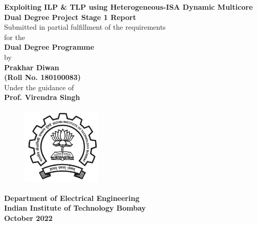 \documentclass[a4paper,12pt, final]{report}
\begin{document}
  \thispagestyle{empty}
  \vspace*{1cm}
  {\centering     
  \textbf{\LARGE Exploiting ILP \& TLP using Heterogeneous-ISA Dynamic Multicore}\\
  \vspace{1.20cm}
  \textbf{\large Dual Degree Project Stage 1 Report}\\
  \vspace{1cm}
  {Submitted in partial fulfillment of the requirements}\\
  \vspace{0.25cm}
  {for the}\\
  \vspace{1cm}
  \textbf{Dual Degree Programme}\\
  \vspace{1.50cm}
  {by}\\
  \vspace{0.20cm}
  \textbf{\large Prakhar Diwan}\\
  \vspace{0.25cm}
  \textbf{\large (Roll No. 180100083)}\\
  \vspace{1.8cm}
  {Under the guidance of}\\
  \vspace{0.20cm}
  \textbf{\large Prof. Virendra Singh}\\
    \vspace{0.30cm}
  \vspace{1.450cm}
    \begin{figure}[htb]
    \begin{center}
    \includegraphics[height=1.5in,width=1.5in]{iitblogo.png}
    \end{center}
    \end{figure}

    
  {\textbf{Department of Electrical Engineering}}\\
  {\textbf{Indian Institute of Technology Bombay}}\\
  {\textbf{October 2022}}
 
 }
 
\end{document}
